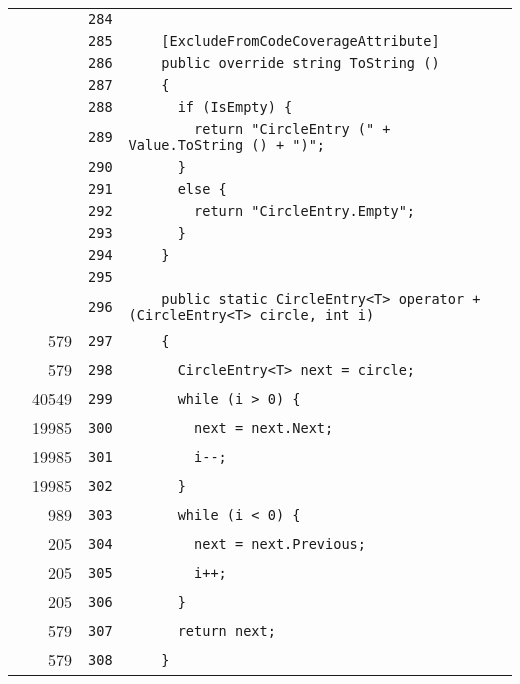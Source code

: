 \documentclass[a4paper,10pt]{article}
\begin{document}
\begin{longtable}[l]{lrrl}
\cellcolor{gray} &  & \verb~284~ & \verb~~\\
\cellcolor{gray} &  & \verb~285~ & \verb~    [ExcludeFromCodeCoverageAttribute]~\\
\cellcolor{gray} &  & \verb~286~ & \verb~    public override string ToString ()~\\
\cellcolor{gray} &  & \verb~287~ & \verb~    {~\\
\cellcolor{gray} &  & \verb~288~ & \verb~      if (IsEmpty) {~\\
\cellcolor{gray} &  & \verb~289~ & \verb~        return "CircleEntry (" + Value.ToString () + ")";~\\
\cellcolor{gray} &  & \verb~290~ & \verb~      }~\\
\cellcolor{gray} &  & \verb~291~ & \verb~      else {~\\
\cellcolor{gray} &  & \verb~292~ & \verb~        return "CircleEntry.Empty";~\\
\cellcolor{gray} &  & \verb~293~ & \verb~      }~\\
\cellcolor{gray} &  & \verb~294~ & \verb~    }~\\
\cellcolor{gray} &  & \verb~295~ & \verb~~\\
\cellcolor{gray} &  & \verb~296~ & \verb~    public static CircleEntry<T> operator + (CircleEntry<T> circle, int i)~\\
\cellcolor{green} & 579 & \verb~297~ & \verb~    {~\\
\cellcolor{green} & 579 & \verb~298~ & \verb~      CircleEntry<T> next = circle;~\\
\cellcolor{green} & 40549 & \verb~299~ & \verb~      while (i > 0) {~\\
\cellcolor{green} & 19985 & \verb~300~ & \verb~        next = next.Next;~\\
\cellcolor{green} & 19985 & \verb~301~ & \verb~        i--;~\\
\cellcolor{green} & 19985 & \verb~302~ & \verb~      }~\\
\cellcolor{green} & 989 & \verb~303~ & \verb~      while (i < 0) {~\\
\cellcolor{green} & 205 & \verb~304~ & \verb~        next = next.Previous;~\\
\cellcolor{green} & 205 & \verb~305~ & \verb~        i++;~\\
\cellcolor{green} & 205 & \verb~306~ & \verb~      }~\\
\cellcolor{green} & 579 & \verb~307~ & \verb~      return next;~\\
\cellcolor{green} & 579 & \verb~308~ & \verb~    }~\\

\end{longtable}
\end{document}
